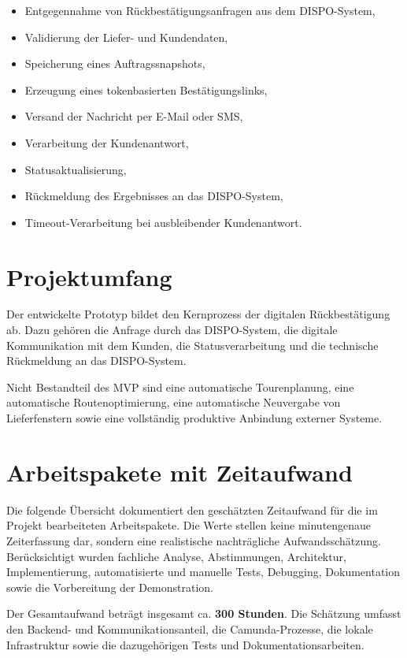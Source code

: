 \documentclass[
12pt,
a4paper,
oneside
]{article}
\begin{document}
	\begin{itemize}
		\item Entgegennahme von Rückbestätigungsanfragen aus dem DISPO-System,
		\item Validierung der Liefer- und Kundendaten,
		\item Speicherung eines Auftragssnapshots,
		\item Erzeugung eines tokenbasierten Bestätigungslinks,
		\item Versand der Nachricht per E-Mail oder SMS,
		\item Verarbeitung der Kundenantwort,
		\item Statusaktualisierung,
		\item Rückmeldung des Ergebnisses an das DISPO-System,
		\item Timeout-Verarbeitung bei ausbleibender Kundenantwort.
	\end{itemize}
	
	\section{Projektumfang}
	
	Der entwickelte Prototyp bildet den Kernprozess der digitalen Rückbestätigung ab.
	Dazu gehören die Anfrage durch das DISPO-System, die digitale Kommunikation mit dem
	Kunden, die Statusverarbeitung und die technische Rückmeldung an das DISPO-System.
	
	Nicht Bestandteil des MVP sind eine automatische Tourenplanung, eine automatische
	Routenoptimierung, eine automatische Neuvergabe von Lieferfenstern sowie eine
	vollständig produktive Anbindung externer Systeme.
	


\section{Arbeitspakete mit Zeitaufwand}

Die folgende \"Ubersicht dokumentiert den gesch\"atzten Zeitaufwand f\"ur die im Projekt bearbeiteten Arbeitspakete. Die Werte stellen keine minutengenaue Zeiterfassung dar, sondern eine realistische nachtr\"agliche Aufwandssch\"atzung. Ber\"ucksichtigt wurden fachliche Analyse, Abstimmungen, Architektur, Implementierung, automatisierte und manuelle Tests, Debugging, Dokumentation sowie die Vorbereitung der Demonstration.

Der Gesamtaufwand betr\"agt insgesamt ca. \textbf{300 Stunden}. Die Sch\"atzung umfasst den Backend- und Kommunikationsanteil, die Camunda-Prozesse, die lokale Infrastruktur sowie die dazugeh\"origen Tests und Dokumentationsarbeiten.
\end{document}
